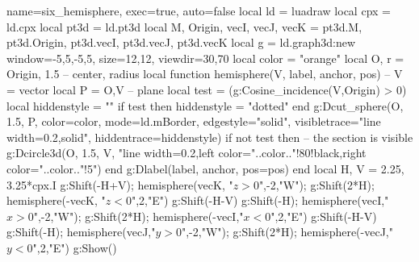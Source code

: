 \documentclass[border=5pt]{standalone}%
\begin{document}
\begin{luadraw}{name=six_hemisphere, exec=true, auto=false}
local ld = luadraw
local cpx = ld.cpx
local pt3d = ld.pt3d
local M, Origin, vecI, vecJ, vecK = pt3d.M, pt3d.Origin, pt3d.vecI, pt3d.vecJ, pt3d.vecK
local g = ld.graph3d:new{ window={-5,5,-5,5}, size={12,12}, viewdir={30,70} }
local color = "orange"
local O, r = Origin, 1.5 -- center, radius
local function hemisphere(V, label, anchor, pos) -- V = vector
    local P = {O,V} -- plane
    local test = (g:Cosine_incidence(V,Origin) > 0)
    local hiddenstyle = ""
    if test then hiddenstyle = "dotted" end
    g:Dcut_sphere(O, 1.5, P, {color=color, mode=ld.mBorder, edgestyle="solid", visibletrace="line width=0.2,solid", hiddentrace=hiddenstyle})
    if not test then -- the section is visible
        g:Dcircle3d(O, 1.5, V, "line width=0.2,left color="..color.."!80!black,right color="..color.."!5")
    end
    g:Dlabel(label, anchor, {pos=pos})
end
local H, V = 2.25, 3.25*cpx.I
g:Shift(-H+V); hemisphere(vecK, "$z>0$",-2,"W"); g:Shift(2*H); hemisphere(-vecK, "$z<0$",2,"E")
g:Shift(-H-V)
g:Shift(-H); hemisphere(vecI,"$x>0$",-2,"W"); g:Shift(2*H); hemisphere(-vecI,"$x<0$",2,"E")
g:Shift(-H-V)
g:Shift(-H); hemisphere(vecJ,"$y>0$",-2,"W"); g:Shift(2*H); hemisphere(-vecJ,"$y<0$",2,"E")
g:Show()
\end{luadraw}
\end{document}
